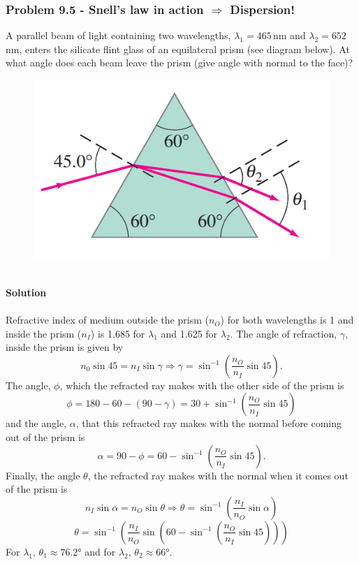 \documentclass{article}
\begin{document}
\subsubsection*{Problem 9.5 - Snell's law in action $\Rightarrow$ Dispersion!}
A parallel beam of light containing two wavelengths, $\lambda_1=465\,$nm and $\lambda_2=652\,$nm, enters the silicate flint glass of an equilateral prism (see diagram below). At what angle does each beam leave the prism (give angle with normal to the face)?
\begin{figure}[h]
    \centering
    \includegraphics[width=0.4\linewidth]{figs/fig_prob_9.5.png}
\end{figure}
\\\textbf{Solution}
\\
\\Refractive index of medium outside the prism ($n_O$) for both wavelengths is 1 and inside the prism ($n_I$) is 1.685 for $\lambda_1$ and 1.625 for $\lambda_2$. The angle of refraction, $\gamma$, inside the prism is given by
\[n_0\sin45=n_I\sin\gamma\Rightarrow\gamma=\sin^{-1}\left(\frac{n_O}{n_I}\sin45\right).\]
The angle, $\phi$, which the refracted ray makes with the other side of the prism is
\[\phi=180-60-(90-\gamma)=30+\sin^{-1}\left(\frac{n_O}{n_I}\sin45\right)\]
and the angle, $\alpha$, that this refracted ray makes with the normal before coming out of the prism is
\[\alpha=90-\phi=60-\sin^{-1}\left(\frac{n_O}{n_I}\sin45\right).\]
Finally, the angle $\theta$, the refracted ray makes with the normal when it comes out of the prism is 
\[n_I\sin\alpha=n_O\sin\theta\Rightarrow\theta=\sin^{-1}\left(\frac{n_I}{n_O}\sin\alpha\right)\]
\[\theta=\sin^{-1}\left(\frac{n_I}{n_O}\sin\left(60-\sin^{-1}\left(\frac{n_O}{n_I}\sin45\right)\right)\right)\]
For $\lambda_1$, $\theta_1\approx76.2$° and for $\lambda_2$, $\theta_2\approx66$°.
\end{document}
